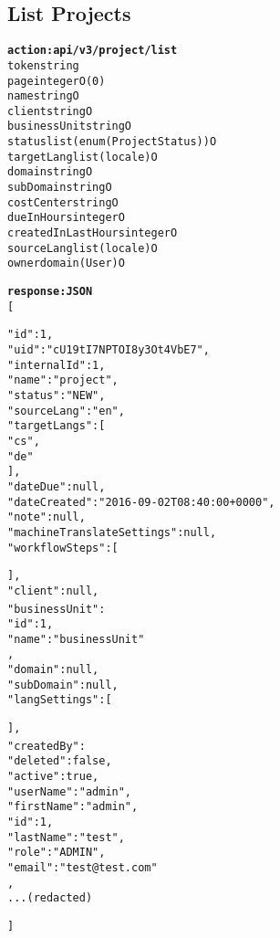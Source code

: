 \subsection{List Projects}
\begin{alltt}
\textbf{action: api/v3/project/list}
token                       string
page                        integer                    O(0)
name                        string                     O
client                      string                     O
businessUnit                string                     O
status                      list(enum(ProjectStatus))  O
targetLang                  list(locale)               O
domain                      string                     O
subDomain                   string                     O
costCenter                  string                     O
dueInHours                  integer                    O
createdInLastHours          integer                    O
sourceLang                  list(locale)               O
owner                       domain(User)               O

\textbf{response: JSON}
[
{
	"id":1,
	"uid":"cU19tI7NPTOI8y3Ot4VbE7",
	"internalId":1,
	"name":"project",
	"status":"NEW",
	"sourceLang":"en",
	"targetLangs":[
	"cs",
	"de"
	],
	"dateDue":null,
	"dateCreated":"2016-09-02T08:40:00+0000",
	"note":null,
	"machineTranslateSettings":null,
	"workflowSteps":[
	
	],
	"client":null,
	"businessUnit":{
		"id":1,
		"name":"businessUnit"
	},
	"domain":null,
	"subDomain":null,
	"langSettings":[
	
	],
	"createdBy":{
		"deleted":false,
		"active":true,
		"userName":"admin",
		"firstName":"admin",
		"id":1,
		"lastName":"test",
		"role":"ADMIN",
		"email":"test@test.com"
	},
	...(redacted)
}
]
\end{alltt}